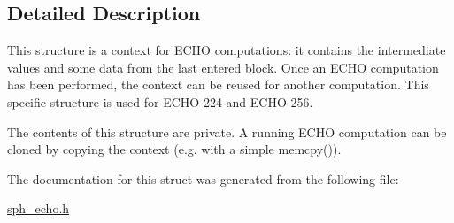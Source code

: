 \subsection{Detailed Description}
This structure is a context for E\+C\+HO computations\+: it contains the intermediate values and some data from the last entered block. Once an E\+C\+HO computation has been performed, the context can be reused for another computation. This specific structure is used for E\+C\+H\+O-\/224 and E\+C\+H\+O-\/256.

The contents of this structure are private. A running E\+C\+HO computation can be cloned by copying the context (e.\+g. with a simple {\ttfamily memcpy()}). 

The documentation for this struct was generated from the following file\+:\begin{DoxyCompactItemize}
\item 
\mbox{\hyperlink{sph__echo_8h}{sph\+\_\+echo.\+h}}\end{DoxyCompactItemize}
